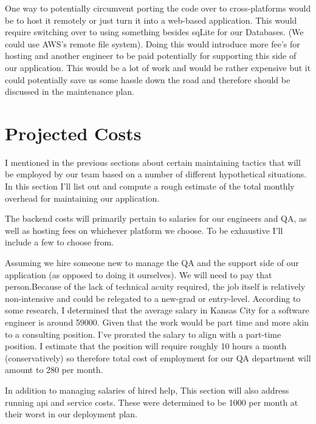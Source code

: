 \documentclass{roffin}
\begin{document}
One way to potentially circumvent porting the code over to cross-platforms would be to host it remotely or just turn it into a web-based application. This would require switching over to using something besides sqLite for our Databases. (We could use AWS's remote file system). Doing this would introduce more fee's for hosting and another engineer to be paid potentially for supporting this side of our application. This would be a lot of work and would be rather expensive but it could potentially save us some hassle down the road and therefore should be discussed in the maintenance plan. 












\section{Projected Costs}
 I mentioned in the previous sections about certain maintaining tactics that will be employed by our team based on a number of different hypothetical situations. In this section I'll list out and compute a rough estimate of the total monthly overhead for maintaining our application. 

The backend costs will primarily pertain to salaries for our engineers and QA, as well as hosting fees on whichever platform we choose. To be exhaustive I'll include a few to choose from. 

Assuming we hire someone new to manage the QA and the support side of our application (as opposed to doing it ourselves). We will need to pay that person.Because of the lack of technical acuity required, the job itself is relatively non-intensive and could be relegated to a new-grad or entry-level. According to some research, I determined that the average salary in Kansas City for a software engineer is around 59000. Given that the work would be part time and more akin to a consulting position. I've prorated the salary to align with a part-time position. I estimate that the position will require roughly 10 hours a month (conservatively) so therefore total cost of employment for our QA department will amount to 280 per month.

In addition to managing salaries of hired help, This section will also address running api and service costs. These were determined to be 1000 per month at their worst in our deployment plan.  
\end{document}
